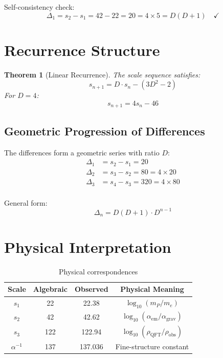 \documentclass[12pt,a4paper]{article}
\newtheorem{theorem}{Theorem}[section]
\begin{document}
Self-consistency check:
\[
\Delta_1 = s_2 - s_1 = 42 - 22 = 20 = 4 \times 5 = D(D+1) \quad \checkmark
\]

\section{Recurrence Structure}

\begin{theorem}[Linear Recurrence]
The scale sequence satisfies:
\begin{equation}
s_{n+1} = D \cdot s_n - (3D^2 - 2)
\end{equation}
For $D = 4$:
\begin{equation}
s_{n+1} = 4s_n - 46
\end{equation}
\end{theorem}

\subsection{Geometric Progression of Differences}

The differences form a geometric series with ratio $D$:
\begin{align*}
\Delta_1 &= s_2 - s_1 = 20 \\
\Delta_2 &= s_3 - s_2 = 80 = 4 \times 20 \\
\Delta_3 &= s_4 - s_3 = 320 = 4 \times 80 \\
\end{align*}

General form:
\begin{equation}
\Delta_n = D(D+1) \cdot D^{n-1}
\end{equation}

\section{Physical Interpretation}

\begin{table}[h]
\centering
\begin{tabular}{cccc}
\toprule
\textbf{Scale} & \textbf{Algebraic} & \textbf{Observed} & \textbf{Physical Meaning} \\
\midrule
$s_1$ & 22 & 22.38 & $\log_{10}(m_P/m_e)$ \\
$s_2$ & 42 & 42.62 & $\log_{10}(\alpha_\text{em}/\alpha_\text{grav})$ \\
$s_3$ & 122 & 122.94 & $\log_{10}(\rho_\text{QFT}/\rho_\text{obs})$ \\
$\alpha^{-1}$ & 137 & 137.036 & Fine-structure constant \\
\bottomrule
\end{tabular}
\caption{Physical correspondences}
\end{table}
\end{document}
